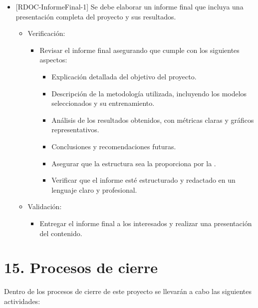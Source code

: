 \documentclass[
11pt, %
]{charter}
\begin{document}
\begin{itemize}[label={}]
  \item {[}RDOC-InformeFinal-1{]} Se debe elaborar un informe final que incluya una presentación completa del proyecto y sus resultados.
        \begin{itemize}
          \item Verificación:
                \begin{itemize}
                  \item Revisar el informe final asegurando que cumple con los siguientes aspectos:
                        \begin{itemize}
                          \item Explicación detallada del objetivo del proyecto.
                          \item Descripción de la metodología utilizada, incluyendo los modelos seleccionados y su entrenamiento.
                          \item Análisis de los resultados obtenidos, con métricas claras y gráficos representativos.
                          \item Conclusiones y recomendaciones futuras.
                          \item Asegurar que la estructura sea la proporciona por la \pertesupname.
                          \item Verificar que el informe esté estructurado y redactado en un lenguaje claro y profesional.
                        \end{itemize}
                \end{itemize}
          \item Validación:
                \begin{itemize}
                  \item Entregar el informe final a los interesados y realizar una presentación del contenido.
                \end{itemize}
        \end{itemize}
\end{itemize}

\section{15. Procesos de cierre}
\label{sec:cierre}

Dentro de los procesos de cierre de este proyecto se llevarán a cabo las siguientes actividades:
\end{document}
